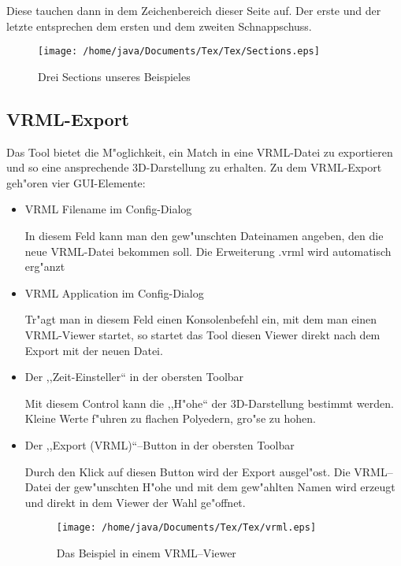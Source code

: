 Diese tauchen dann in dem Zeichenbereich dieser Seite auf. Der erste und der letzte entsprechen dem ersten und dem zweiten Schnappschuss.
\begin{figure}
   \centering
   \texttt{[image: /home/java/Documents/Tex/Tex/Sections.eps]}
   \caption{Drei Sections unseres Beispieles}
   \label{fig:Sections}
\end{figure}
\subsection{VRML-Export}
Das Tool bietet die M"oglichkeit, ein Match in eine VRML-Datei zu exportieren und so eine ansprechende 3D-Darstellung zu erhalten. Zu dem VRML-Export geh"oren vier GUI-Elemente:
\begin{itemize}
\item VRML Filename im Config-Dialog

 In diesem Feld kann man den gew"unschten Dateinamen angeben, den die neue VRML-Datei bekommen soll. Die Erweiterung .vrml wird automatisch erg"anzt
\item VRML Application im Config-Dialog

Tr"agt man in diesem Feld einen Konsolenbefehl ein, mit dem man einen VRML-Viewer startet, so startet das Tool diesen Viewer direkt nach dem Export mit der neuen Datei.

\item Der ,,Zeit-Einsteller`` in der obersten Toolbar

Mit diesem Control kann die ,,H"ohe`` der 3D-Darstellung bestimmt werden. Kleine Werte f"uhren zu flachen Polyedern, gro"se zu hohen.
\item Der ,,Export (VRML)``--Button in der obersten Toolbar

Durch den Klick auf diesen Button wird der Export ausgel"ost. Die VRML--Datei der gew"unschten H"ohe und mit dem gew"ahlten Namen wird erzeugt und direkt in dem Viewer der Wahl ge"offnet.
\begin{figure}
   \centering
   \texttt{[image: /home/java/Documents/Tex/Tex/vrml.eps]}
   \caption{Das Beispiel in einem VRML--Viewer}
   \label{fig:vrml}
\end{figure}
\end{itemize}
